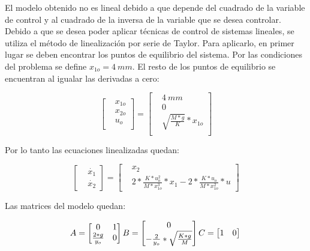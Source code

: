 \noindent El modelo obtenido no es lineal debido a que depende del cuadrado de la variable de control y al cuadrado de la inversa de la variable que se desea controlar. Debido a que se desea poder aplicar técnicas de control de sistemas lineales, se utiliza el método de linealización por serie de Taylor. Para aplicarlo, en primer lugar se deben encontrar los puntos de equilibrio del sistema. Por las condiciones del problema se define $x_{1o}=4\:mm$. El resto de los puntos de equilibrio se encuentran al igualar las derivadas a cero:

\begin{equation*}
\begin{bmatrix}
		&x_{1o}\\
		&x_{2o}\\
		&u_{o}\\
\end{bmatrix}
=
\begin{bmatrix}
	&4\:mm\\
	&0\\
	&\sqrt{\frac{M*g}{K}}*x_{1o}\\
\end{bmatrix}
\end{equation*}

\noindent Por lo tanto las ecuaciones linealizadas quedan:

\begin{equation*} 
	\begin{bmatrix}
		&\dot{x_{1}}\\
		&\dot{x_{2}}
	\end{bmatrix}
	=
	\begin{bmatrix}
		&x_{2}\\
		&2*\frac{K*u_{o}^{2}}{M*x_{1o}^{3}}*x_{1}-2*\frac{K*u_{o}}{M*x_{1o}^{2}}*u
	\end{bmatrix}
\end{equation*}

\noindent Las matrices del modelo quedan:

\begin{equation*}
	A=
	\begin{bmatrix}
		0 & 1\\
		\frac{2*g}{y_{o}} & 0
	\end{bmatrix}\\
	  B=
	\begin{bmatrix}
	0\\
	-\frac{2}{y_{o}}*\sqrt{\frac{K*g}{M}}
	\end{bmatrix}\\
	  C=
	\begin{bmatrix}
	1 & 0\\
	\end{bmatrix}\\
\end{equation*}



